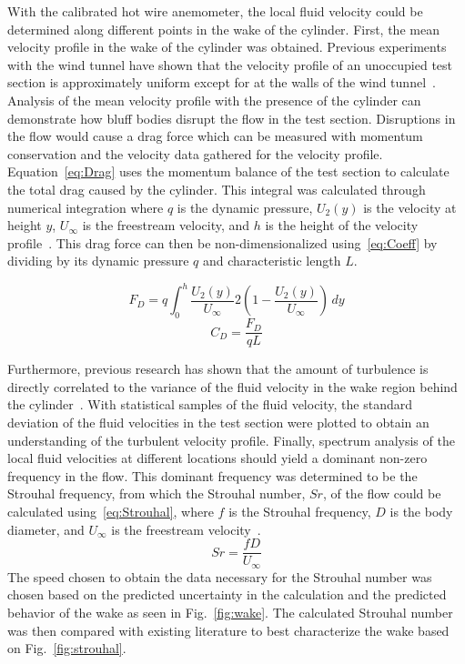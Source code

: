 \documentclass[journal,letterpaper]{IEEEtran}
\begin{document}
With the calibrated hot wire anemometer, the local fluid velocity could be determined along different points in the wake of the cylinder.
First, the mean velocity profile in the wake of the cylinder was obtained.
Previous experiments with the wind tunnel have shown that the velocity profile of an unoccupied test section is approximately uniform except for at the walls of the wind tunnel~\cite{Lab1}.
Analysis of the mean velocity profile with the presence of the cylinder can demonstrate how bluff bodies disrupt the flow in the test section.
Disruptions in the flow would cause a drag force which can be measured with momentum conservation and the velocity data gathered for the velocity profile.
Equation~\eqref{eq:Drag} uses the momentum balance of the test section to calculate the total drag caused by the cylinder.
This integral was calculated through numerical integration where $q$ is the dynamic pressure, $U_2 (y)$ is the velocity at height $y$, $U_\infty$ is the freestream velocity, and $h$ is the height of the velocity profile~\cite{DragData}.
This drag force can then be non-dimensionalized using~\eqref{eq:Coeff} by dividing by its dynamic pressure $q$ and characteristic length $L$.

\begin{equation} \label{eq:Drag}
    F_D = q\int_{0}^{h} \frac{U_2 (y)}{U_\infty}2 \left(1 - \frac{U_2 (y)}{U_\infty}\right)\,dy
\end{equation}
\begin{equation} \label{eq:Coeff}
    C_D = \frac{F_D}{qL}
\end{equation}

Furthermore, previous research has shown that the amount of turbulence is directly correlated to the variance of the fluid velocity in the wake region behind the cylinder~\cite{Strouhal}.
With statistical samples of the fluid velocity, the standard deviation of the fluid velocities in the test section were plotted to obtain an understanding of the turbulent velocity profile.
Finally, spectrum analysis of the local fluid velocities at different locations should yield a dominant non-zero frequency in the flow.
This dominant frequency was determined to be the Strouhal frequency, from which the Strouhal number, $Sr$, of the flow could be calculated using~\eqref{eq:Strouhal}, where $f$ is the Strouhal frequency, $D$ is the body diameter, and $U_\infty$ is the freestream velocity~\cite{Strouhal}.
\begin{equation} \label{eq:Strouhal}
    Sr = \frac{fD}{U_\infty}
\end{equation}
The speed chosen to obtain the data necessary for the Strouhal number was chosen based on the predicted uncertainty in the calculation and the predicted behavior of the wake as seen in Fig.~\ref{fig:wake}.
The calculated Strouhal number was then compared with existing literature to best characterize the wake based on Fig.~\ref{fig:strouhal}. 
\end{document}

